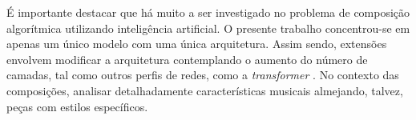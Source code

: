 \documentclass{automatextcc}
\begin{document}
É importante destacar que há muito a ser investigado no problema de composição algorítmica utilizando inteligência artificial. O presente trabalho concentrou-se em apenas um único modelo com uma única arquitetura. Assim sendo, extensões envolvem modificar a arquitetura contemplando o aumento do número de camadas, tal como outros perfis de redes, como a \textit{transformer} \citep{vaswani2017}. No contexto das composições, analisar detalhadamente características musicais almejando, talvez, peças com estilos específicos.







\end{document}
